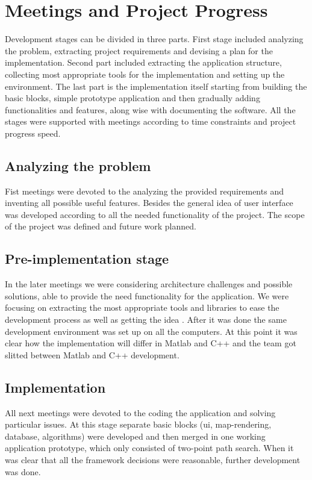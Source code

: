 \section{Meetings and Project Progress}

Development stages can be divided in three parts. First stage included analyzing the problem, extracting project requirements and devising a plan for the implementation. Second part included extracting the application structure, collecting most appropriate tools for the implementation and setting up the environment. The last part is the implementation itself starting from building the basic blocks, simple prototype application and then gradually adding functionalities and features, along wise with documenting the software. All the stages were supported with meetings according to time constraints and project progress speed.

\subsection{Analyzing the problem}
Fist meetings were devoted to the analyzing the provided requirements and inventing all possible useful features. Besides the general idea of user interface was developed according to all the needed functionality of the project. The scope of the project was defined and future work planned.

\subsection{Pre-implementation stage}
In the later meetings we were considering architecture challenges and possible solutions, able to provide the need functionality for the application. We were focusing on extracting the most appropriate tools and libraries to ease the development process as well as getting the idea . After it was done the same development environment was set up on all the computers. At this point it was clear how the implementation will differ in Matlab and C++ and the team got slitted between Matlab and C++ development.

\subsection{Implementation}
All next meetings were devoted to the coding the application and solving particular issues. At this stage separate basic blocks (ui, map-rendering, database, algorithms) were developed and then merged in one working application prototype, which only consisted of two-point path search. When it was clear that all the framework decisions were reasonable, further development was done.

